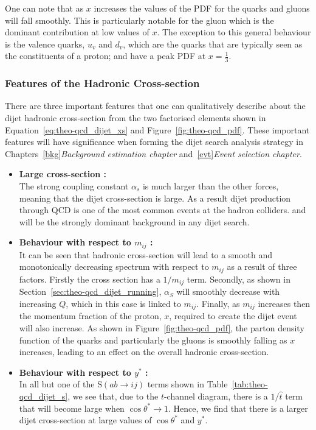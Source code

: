 One can note that as $x$ increases the values of the PDF for the quarks and gluons will fall smoothly.
This is particularly notable for the gluon which is the dominant contribution at low values of $x$.
The exception to this general behaviour is the valence quarks,
$u_v$ and $d_v$,
which are the quarks that are typically seen as the constituents of a proton; and have a peak PDF at $x =\frac{1}{3}$.

\subsubsection{Features of the Hadronic Cross-section}

There are three important features that one can qualitatively describe about the dijet hadronic cross-section
from the two factorised elements shown in Equation~\ref{eq:theo-qcd_dijet_xs} and Figure~\ref{fig:theo-qcd_pdf}.
These important features will have significance when forming the dijet search analysis strategy in
Chapters~\ref{bkg}\textit{Background estimation chapter} and~\ref{evt}\textit{Event selection chapter}.

\begin{itemize}[leftmargin=*]
\item\textbf{Large cross-section :}\\
  The strong coupling constant $\alpha_s$ is much larger than the other forces,
  meaning that the dijet cross-section is large.
  As a result dijet production through QCD is one of the most common events at the hadron colliders.
  and will be the strongly dominant background in any dijet search.\vspace{0.5em}
\item\textbf{Behaviour with respect to $m_{ij}$ :}\\
  It can be seen that hadronic cross-section will
  lead to a smooth and monotonically decreasing spectrum
  with respect to $m_{ij}$ as a result of three factors.
  Firstly the cross section has a $1/m_{ij}$ term.
  Secondly, as shown in Section~\ref{sec:theo-qcd_dijet_running},
  $\alpha_S$ will smoothly decrease with increasing $Q$, which in this case is linked to $m_{ij}$.
  Finally, as $m_{ij}$ increases then the momentum fraction of the proton, $x$, required to create
  the dijet event will also increase.
  As shown in Figure~\ref{fig:theo-qcd_pdf}, the parton density function of the quarks and particularly the gluons
  is smoothly falling as $x$ increases, leading to an effect on the overall hadronic cross-section.
  \vspace{0.5em}
\item\textbf{Behaviour with respect to $y^*$ :}\\
  In all but one of the $\text{S}(ab \to ij)$ terms shown in Table~\ref{tab:theo-qcd_dijet_s},
  we see that, due to the $t$-channel diagram, there is a $1/\hat{t}$ term that will become large when $\cos{\theta^*} \to 1$.
  Hence, we find that there is a larger dijet cross-section at large values of $\cos{\theta^*}$ and $y^*$.
  \vspace{0.5em}
\end{itemize}


